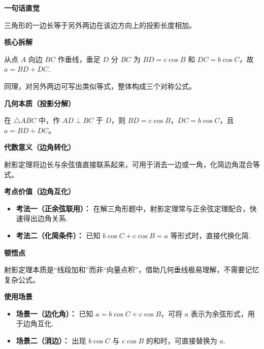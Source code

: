\begin{explanationbox}
	\textbf{\textcolor{CExplanation}{一句话直觉}}

	三角形的一边长等于另外两边在该边方向上的投影长度相加。

	\medskip
	\textbf{\textcolor{CExplanation}{核心拆解}}
	\begin{description}[style=nextline, leftmargin=2.8em, labelsep=0.5em, itemsep=0.45em]
		\item[\textbf{要点一（投影关系）：}] 从点 $A$ 向边 $BC$ 作垂线，垂足 $D$ 分 $BC$ 为 $BD = c\cos B$ 和 $DC = b\cos C$，故 $a = BD + DC$.
		\item[\textbf{要点二（轮换对称）：}] 同理，对另外两边可写出类似等式，整体构成三个对称公式。
	\end{description}

	\medskip
	\textbf{\textcolor{CExplanation}{几何本质（投影分解）}}

	在 $\triangle ABC$ 中，作 $AD \perp BC$ 于 $D$，则 $BD = c\cos B$，$DC = b\cos C$，且 $a = BD + DC$。

	\medskip
	\textbf{\textcolor{CExplanation}{代数意义（边角转化）}}

	射影定理将边长与余弦值直接联系起来，可用于消去一边或一角，化简边角混合等式。

	\medskip
	\textbf{\textcolor{CExplanation}{考点价值（边角互化）}}
	\begin{itemize}[leftmargin=*, itemsep=0.5em, topsep=0.4em]
		\item \textbf{考法一（正余弦联用）：} 在解三角形题中，射影定理常与正余弦定理配合，快速得出边角关系.
		\item \textbf{考法二（化简条件）：} 已知 $b\cos C + c\cos B = a$ 等形式时，直接代换化简.
	\end{itemize}

	\medskip
	\textbf{\textcolor{CExplanation}{顿悟点}}

	射影定理本质是“线段加和”而非“向量点积”，借助几何垂线极易理解，不需要记忆复杂公式。

	\medskip
	\textbf{\textcolor{CExplanation}{使用场景}}
	\begin{itemize}[leftmargin=*, itemsep=0.5em, topsep=0.4em]
		\item \textbf{场景一（边化角）：} 已知 $a = b\cos C + c\cos B$，可将 $a$ 表示为余弦形式，用于边角互化.
		\item \textbf{场景二（消边）：} 出现 $b\cos C$ 与 $c\cos B$ 的和时，可直接替换为 $a$.
	\end{itemize}
\end{explanationbox}

